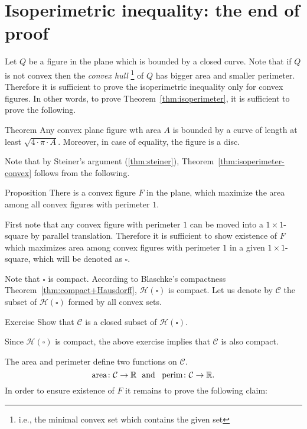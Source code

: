 \section{Isoperimetric inequality: the end of proof}

Let $Q$ be a figure in the plane which is bounded by a closed curve.
Note that if $Q$ is not convex then the \emph{convex hull}%
\footnote{i.e., the minimal convex set which contains the given set}
 of $Q$ has bigger area and smaller perimeter.
Therefore it is sufficient to prove the isoperimetric inequality only for convex figures.
In other words, to prove Theorem~\ref{thm:isoperimeter},
it is sufficient to prove the following.

\begin{thm}{Theorem}\label{thm:isoperimeter-convex}
Any convex plane figure wth area $A$ is bounded by a curve of length at least
$\sqrt{4\cdot \pi\cdot A}$.
Moreover, in case of equality, the figure is a disc.
\end{thm}

Note that by Steiner's argument (\ref{thm:steiner}),
Theorem~\ref{thm:isoperimeter-convex} follows from the following.

\begin{thm}{Proposition}\label{prp:there_is_F}
There is a convex figure $F$ in the plane,
which maximize the area among all convex figures with perimeter $1$.
\end{thm}


First note that any convex figure with perimeter $1$ can be moved into a $1\times1$-square by parallel translation.
Therefore it is sufficient to show existence of $F$ which maximizes area among convex figures with perimeter $1$ in a given $1 \times 1$-square, which will be denoted as $\square$.

Note that $\square$ is compact.
According to Blaschke's compactness Theorem~\ref{thm:compact+Hausdorff}, 
$\mathcal{H}(\square)$ is compact.
Let us denote by $\mathcal{C}$ the subset of $\mathcal{H}(\square)$ formed by all convex sets.

\begin{thm}{Exercise}\label{ex:convex=closed-in-H}
Show that $\mathcal{C}$ is a closed subset of $\mathcal{H}(\square)$.
\end{thm}

Since $\mathcal{H}(\square)$ is compact,
the above exercise implies that $\mathcal{C}$ is also compact.

The area and perimeter define two functions on $\mathcal{C}$.
$$\area\:\mathcal{C}\to\RR\ \ \text{and}\ \ \per\:\mathcal{C}\to\RR.$$
In order to ensure existence of $F$ it remains to prove the following claim:

